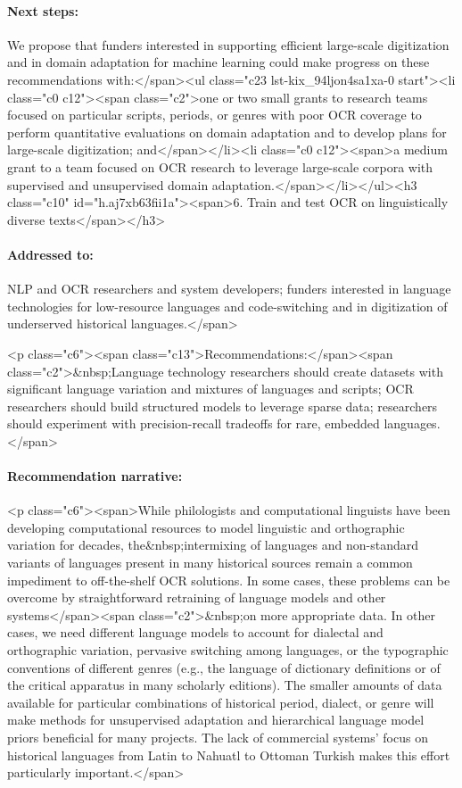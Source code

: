 \documentclass[twoside,11pt]{report}
\begin{document}
\paragraph{Next steps:} We propose that funders interested in supporting efficient large-scale digitization and in domain adaptation for machine learning could make progress on these recommendations with:</span><ul class="c23 lst-kix_94ljon4sa1xa-0 start"><li class="c0 c12"><span class="c2">one or two small grants to research teams focused on particular scripts, periods, or genres with poor OCR coverage to perform quantitative evaluations on domain adaptation and to develop plans for large-scale digitization; and</span></li><li class="c0 c12"><span>a medium grant to a team focused on OCR research to leverage large-scale corpora with supervised and unsupervised domain adaptation.</span></li></ul><h3 class="c10" id="h.aj7xb63fii1a"><span>6. Train and test OCR on linguistically diverse texts</span></h3>

\paragraph{Addressed to:} NLP and OCR researchers and system developers; funders interested in language technologies for low-resource languages and code-switching and in digitization of underserved historical languages.</span>

<p class="c6"><span class="c13">Recommendations:</span><span class="c2">&nbsp;Language technology researchers should create datasets with significant language variation and mixtures of languages and scripts; OCR researchers should build structured models to leverage sparse data; researchers should experiment with precision-recall tradeoffs for rare, embedded languages.</span>

\paragraph{Recommendation narrative:}

<p class="c6"><span>While philologists and computational linguists have been developing computational resources to model linguistic and orthographic variation for decades, the&nbsp;intermixing of languages and non-standard variants of languages present in many historical sources remain a common impediment to off-the-shelf OCR solutions. In some cases, these problems can be overcome by straightforward retraining of language models and other systems</span><span class="c2">&nbsp;on more appropriate data. In other cases, we need different language models to account for dialectal and orthographic variation, pervasive switching among languages, or the typographic conventions of different genres (e.g., the language of dictionary definitions or of the critical apparatus in many scholarly editions). The smaller amounts of data available for particular combinations of historical period, dialect, or genre will make methods for unsupervised adaptation and hierarchical language model priors beneficial for many projects. The lack of commercial systems' focus on historical languages from Latin to Nahuatl to Ottoman Turkish makes this effort particularly important.</span>
\end{document}
